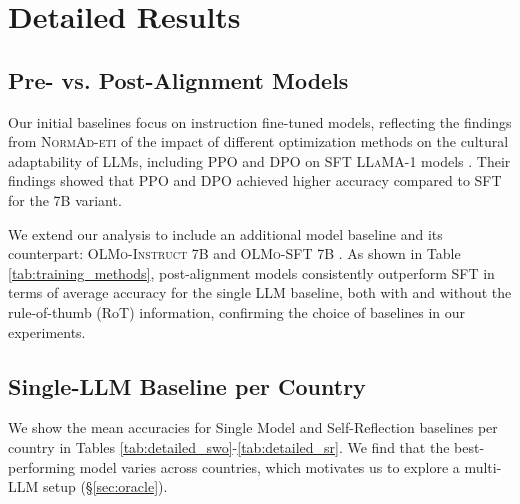 \documentclass[11pt]{article}
\begin{document}




\section{Detailed Results}


\subsection{Pre- vs. Post-Alignment Models}
\label{appendix:pre_post_alignment}
Our initial baselines focus on instruction fine-tuned models, reflecting the findings from \textsc{NormAd-eti} \citep{normad} of the impact of different optimization methods on the cultural adaptability of LLMs, including PPO \citep{schulman2017proximalpolicyoptimizationalgorithms} and DPO \citep{rafailov2024directpreferenceoptimizationlanguage} on SFT \textsc{LLaMA-1} models \citep{touvron2023llamaopenefficientfoundation}. Their findings showed that PPO and DPO achieved higher accuracy compared to SFT for the 7\textsc{B} variant.

We extend our analysis to include an additional model baseline and its counterpart: \textsc{OLMo-Instruct 7B} and \textsc{OLMo-SFT 7B} \citep{groeneveld-etal-2024-olmo}. As shown in Table \ref{tab:training_methods}, post-alignment models consistently outperform SFT in terms of average accuracy for the single LLM baseline, both with and without the rule-of-thumb (RoT) information, confirming the choice of baselines in our experiments.





\subsection{Single-LLM Baseline per Country}
\label{appendix:detailed_single_llm}
We show the mean accuracies for Single Model and Self-Reflection baselines per country in Tables \ref{tab:detailed_swo}-\ref{tab:detailed_sr}. We find that the best-performing model varies across countries, which motivates us to explore a multi-LLM setup (\S \ref{sec:oracle}).
\end{document}
